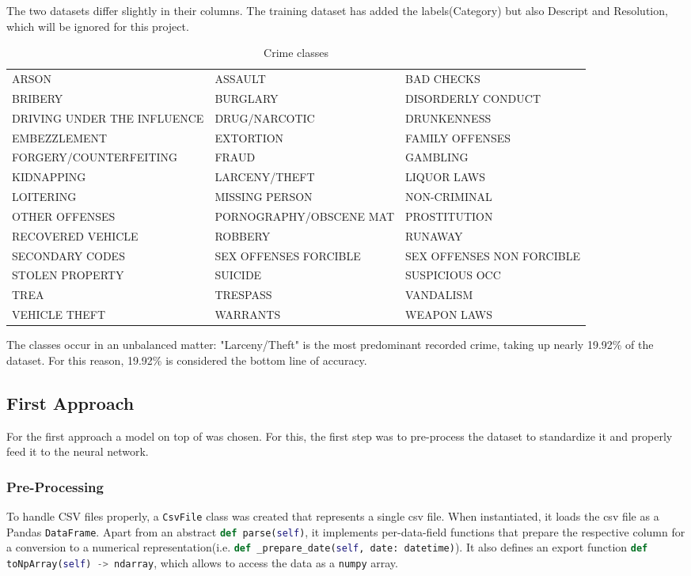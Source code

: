 \documentclass[12pt,a4paper]{scrartcl}
\newcommand{\inlinelisting}[1]{\colorbox{BackgroundColour!95!ForegroundColour}{\color{ForegroundColour!70!BackgroundColour}\lstinline[columns=fixed,language=python]{#1}}}
\begin{document}
The two datasets differ slightly in their columns. The training dataset has added the labels(Category) but also Descript and Resolution, which will be ignored for this project.

\begin{table}[htbp]
\centering
\scriptsize
\setlength\tabcolsep{2pt}
\begin{tabular}{|lll|}\hline
ARSON&ASSAULT&BAD CHECKS\\
BRIBERY&BURGLARY&DISORDERLY CONDUCT\\
DRIVING UNDER THE INFLUENCE&DRUG/NARCOTIC&DRUNKENNESS\\
EMBEZZLEMENT&EXTORTION&FAMILY OFFENSES\\
FORGERY/COUNTERFEITING&FRAUD&GAMBLING\\
KIDNAPPING&LARCENY/THEFT&LIQUOR LAWS\\
LOITERING&MISSING PERSON&NON-CRIMINAL\\
OTHER OFFENSES&PORNOGRAPHY/OBSCENE MAT&PROSTITUTION\\
RECOVERED VEHICLE&ROBBERY&RUNAWAY\\
SECONDARY CODES&SEX OFFENSES FORCIBLE&SEX OFFENSES NON FORCIBLE\\
STOLEN PROPERTY&SUICIDE&SUSPICIOUS OCC\\
TREA&TRESPASS&VANDALISM\\
VEHICLE THEFT&WARRANTS&WEAPON LAWS\\
\hline
\end{tabular}
\caption{Crime classes}
\label{tab:lables}
\end{table}
\pagebreak
The classes occur in an unbalanced matter: "Larceny/Theft" is the most predominant recorded crime, taking up nearly 19.92\% of the dataset. For this reason, 19.92\% is considered the bottom line of accuracy.
\pagebreak

\subsection{First Approach}\label{ss:first_approach}
For the first approach a \cite{keras} model on top of \cite{tensorflow} was chosen. For this, the first step was to pre-process the dataset to standardize it and properly feed it to the neural network.

\subsubsection{Pre-Processing}\label{sss:preprocessing1}
To handle CSV files properly, a \inlinelisting{CsvFile} class was created that represents a single csv file. When instantiated, it loads the csv file as a Pandas \inlinelisting{DataFrame}. Apart from an abstract \inlinelisting{def parse(self)}, it implements per-data-field functions that prepare the respective column for a conversion to a numerical representation(i.e. \inlinelisting{def _prepare_date(self, date: datetime)}). It also defines an export function \inlinelisting{def toNpArray(self) -> ndarray}, which allows to access the data as a \inlinelisting{numpy} array.
\end{document}
